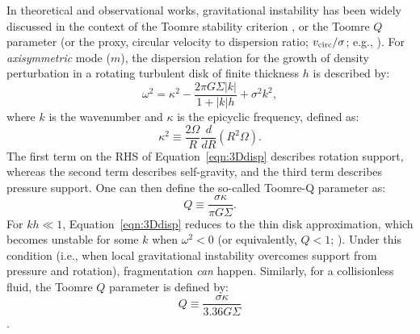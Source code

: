 \IfFileExists{emulateapjlegacy.cls}{\documentclass[iop]{emulateapjlegacy}}{\documentclass[iop]{emulateapj}}
\begin{document}
In theoretical and observational works, gravitational instability has been widely discussed in the 
context of the Toomre stability criterion \citep{Toomre64a, Goldreich65b}, or the Toomre $Q$ parameter 
(or the proxy, circular velocity to dispersion ratio; $v_{\rm circ}/\sigma$; e.g., \citealt{GarciaBurillo03a, Genzel11a, Kassin12a, Leung19a}).
%
For {\it axisymmetric} mode ($m$), the dispersion relation for the growth of density perturbation in a rotating turbulent disk
of finite thickness $h$ 
is described by:
\begin{equation}
\omega^2 = \kappa^2 - \frac{2\pi G \Sigma |k|}{1 + |k| h} + \sigma^2 k^2,
\label{eqn:3Ddisp}
\end{equation}
where $k$ is the wavenumber and $\kappa$ is the epicyclic frequency, defined as:
\begin{equation}
\kappa^2\equiv\frac{2\Omega}{R}\frac{d}{dR}\left(R^2\Omega\right).
\label{eqn:kappa}
\end{equation}
The first term on the RHS of Equation~\ref{eqn:3Ddisp} describes rotation support, whereas the second term describes self-gravity, and
the third term describes pressure support.
One can then define the so-called Toomre-Q parameter as:
\begin{equation}
Q\equiv\frac{\sigma\kappa}{\pi G \Sigma}.
\label{eqn:Q}
\end{equation}
For $kh\ll1$, Equation~\ref{eqn:3Ddisp} reduces to the thin disk approximation, which 
becomes unstable %
for some $k$ when $\omega^2 < 0$ (or equivalently, $Q < 1$; \citealt{Toomre64a}).
Under this condition (i.e., when local gravitational instability 
overcomes support from pressure and rotation), fragmentation {\it can} happen. 
Similarly, for a collisionless fluid, the Toomre $Q$ parameter is defined by:
\begin{equation}
Q\equiv\frac{\sigma\kappa}{3.36 G \Sigma}
\end{equation}
\citep{Toomre64a}.
\end{document}
